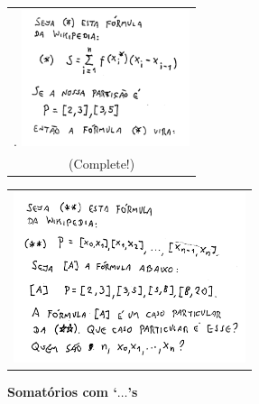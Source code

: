 \documentclass[oneside,12pt]{article}
\begin{document}
\begin{tabular}{c}.
\includegraphics[height=4cm]{2021-2-C2/20211124_wp_1.pdf} \\
(Complete!) \\
\end{tabular}
%
%
\begin{tabular}{c}
\includegraphics[height=5cm]{2021-2-C2/20211124_wp_2.pdf}
\end{tabular}

\newpage


{\bf Somatórios com `$\ldots$'s}
\end{document}
